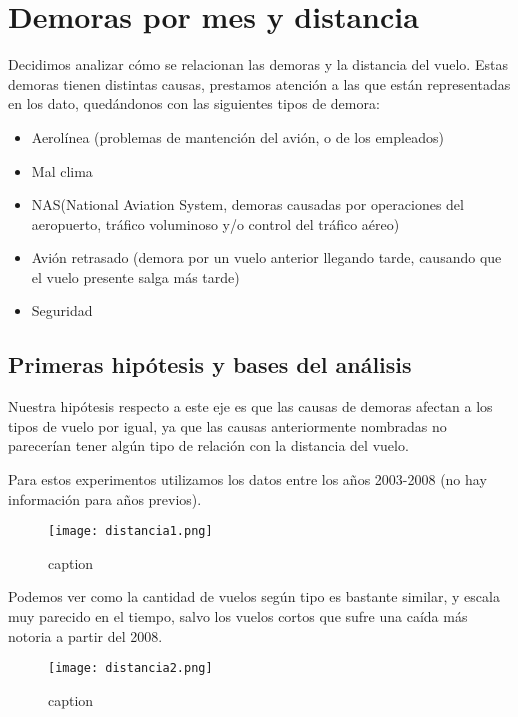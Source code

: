 \section{Demoras por mes y distancia}

Decidimos analizar cómo se relacionan las demoras y la distancia del vuelo. Estas demoras tienen distintas causas, prestamos atención a las que están representadas en los dato, quedándonos con las siguientes tipos de demora:
\begin{itemize}
\item Aerolínea (problemas de mantención del avión, o de los empleados)
\item Mal clima
\item NAS(National Aviation System, demoras causadas por operaciones del aeropuerto, tráfico voluminoso y/o control del tráfico aéreo)
\item Avión retrasado (demora por un vuelo anterior llegando tarde, causando que el vuelo presente salga más tarde)
\item Seguridad
\end{itemize}

\subsection{Primeras hipótesis y bases del análisis}

Nuestra hipótesis respecto a este eje es que las causas de demoras afectan a los tipos de vuelo por igual, ya que las causas anteriormente nombradas no parecerían tener algún tipo de relación con la distancia del vuelo.

Para estos experimentos utilizamos los datos entre los años 2003-2008 (no hay información para años previos).

\begin{figure}[!htb]
\begin{center}
\texttt{[image: distancia1.png]}
\caption{caption}
\label{label}
\end{center}
\end{figure}

Podemos ver como la cantidad de vuelos según tipo es bastante similar, y escala muy parecido en el tiempo, salvo los vuelos cortos que sufre una caída más notoria a partir del 2008.

\begin{figure}[!htb]
\begin{center}
\texttt{[image: distancia2.png]}
\caption{caption}
\label{label}
\end{center}
\end{figure}


